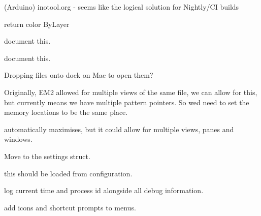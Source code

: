\begin{DoxyRefList}
\label{todo__todo000427}%
%
(Arduino) inotool.\+org -\/ seems like the logical solution for Nightly/\+CI builds 
\item[Global \mbox{\hyperlink{src_2main_8c_adcae0cbecb600049c6dedd95cd9930cd}{get\+Current\+Color}} (void)]\label{todo__todo000178}%
%
return color By\+Layer  
\item[Global \mbox{\hyperlink{src_2main_8c_a6e4c300aad52822a324a91edae2235b6}{Index}} ]\label{todo__todo000003}%
%
document this.  
\item[Global \mbox{\hyperlink{src_2main_8c_ac4aeb4daa04ff262b2f2fd479dc0e98f}{Index\+Entry}} ]\label{todo__todo000002}%
%
document this.  
\item[Global \mbox{\hyperlink{src_2main_8c_a5bf845222a9932ec353859701d62474b}{init\+\_\+view}} (void)]\label{todo__todo000085}%
%
Dropping files onto dock on Mac to open them?

\label{todo__todo000084}%
%
Originally, EM2 allowed for multiple views of the same file, we can allow for this, but currently means we have multiple pattern pointers. So we\textquotesingle{}d need to set the memory locations to be the same place.

\label{todo__todo000086}%
%
automatically maximises, but it could allow for multiple views, panes and windows.  
\item[Global \mbox{\hyperlink{src_2main_8c_a3e6926ae65525832ed3c1ba9d8df636e}{just\+\_\+opened}} ]\label{todo__todo000004}%
%
Move to the settings struct.  
\item[Global \mbox{\hyperlink{src_2main_8c_a39311d663f15b821995a09b0e642ba0a}{languages}} \mbox{[}20\mbox{]}]\label{todo__todo000087}%
%
this should be loaded from configuration.  
\item[Global \mbox{\hyperlink{src_2main_8c_ab32b7623b4a8feb9ddb21f061a97217a}{log\+\_\+debug}} (const char $\ast$msg)]\label{todo__todo000079}%
%
log current time and process id alongside all debug information.  
\item[Global \mbox{\hyperlink{src_2main_8c_a0ddf1224851353fc92bfbff6f499fa97}{main}} (int argc, char $\ast$argv\mbox{[}\mbox{]})]\label{todo__todo000006}%
%
add icons and shortcut prompts to menus. 


\end{DoxyRefList}
